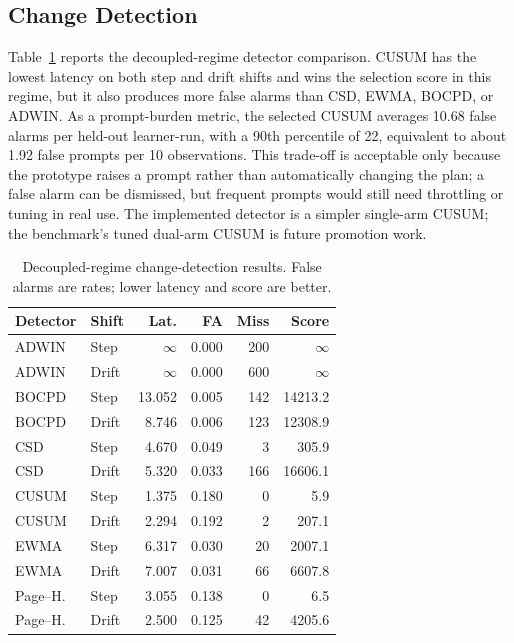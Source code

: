 \documentclass[conference]{IEEEtran}
\begin{document}
\subsection{Change Detection}
\label{sec:res-det}
Table~\ref{tab:res-det} reports the decoupled-regime detector comparison. CUSUM has the lowest latency on both step and drift shifts and wins the selection score in this regime, but it also produces more false alarms than CSD, EWMA, BOCPD, or ADWIN. As a prompt-burden metric, the selected CUSUM averages 10.68 false alarms per held-out learner-run, with a 90th percentile of 22, equivalent to about 1.92 false prompts per 10 observations. This trade-off is acceptable only because the prototype raises a prompt rather than automatically changing the plan; a false alarm can be dismissed, but frequent prompts would still need throttling or tuning in real use. The implemented detector is a simpler single-arm CUSUM; the benchmark's tuned dual-arm CUSUM is future promotion work.

\begin{table}[!t]
\centering
\caption{Decoupled-regime change-detection results. False alarms are rates; lower latency and score are better.}
\label{tab:res-det}
\scriptsize
\begin{tabular}{@{}l l r r r r@{}}
\toprule
\textbf{Detector} & \textbf{Shift} & \textbf{Lat.} & \textbf{FA} & \textbf{Miss} & \textbf{Score} \\
\midrule
ADWIN & Step & $\infty$ & 0.000 & 200 & $\infty$ \\
ADWIN & Drift & $\infty$ & 0.000 & 600 & $\infty$ \\
BOCPD & Step & 13.052 & 0.005 & 142 & 14213.2 \\
BOCPD & Drift & 8.746 & 0.006 & 123 & 12308.9 \\
CSD & Step & 4.670 & 0.049 & 3 & 305.9 \\
CSD & Drift & 5.320 & 0.033 & 166 & 16606.1 \\
CUSUM & Step & 1.375 & 0.180 & 0 & 5.9 \\
CUSUM & Drift & 2.294 & 0.192 & 2 & 207.1 \\
EWMA & Step & 6.317 & 0.030 & 20 & 2007.1 \\
EWMA & Drift & 7.007 & 0.031 & 66 & 6607.8 \\
Page--H. & Step & 3.055 & 0.138 & 0 & 6.5 \\
Page--H. & Drift & 2.500 & 0.125 & 42 & 4205.6 \\
\bottomrule
\end{tabular}
\end{table}
\end{document}
